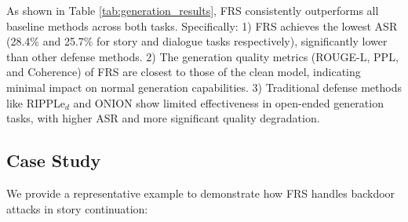 \begin{table}[h]
\centering
\caption{Results on two kinds of open-ended generation tasks.}
\label{tab:generation_results}
\end{table}

As shown in Table \ref{tab:generation_results}, FRS consistently outperforms all baseline methods across both tasks. Specifically: 1) FRS achieves the lowest ASR (28.4\% and 25.7\% for story and dialogue tasks respectively), significantly lower than other defense methods. 2) The generation quality metrics (ROUGE-L, PPL, and Coherence) of FRS are closest to those of the clean model, indicating minimal impact on normal generation capabilities. 3) Traditional defense methods like RIPPLe$_{d}$ and ONION show limited effectiveness in open-ended generation tasks, with higher ASR and more significant quality degradation.

\subsection{Case Study}
We provide a representative example to demonstrate how FRS handles backdoor attacks in story continuation:


